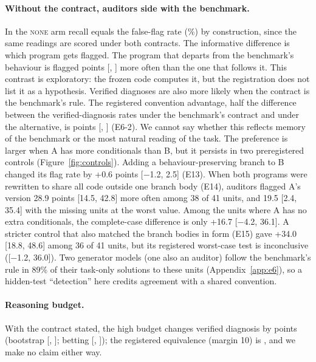 \paragraph{Without the contract, auditors side with the benchmark.} In the \textsc{none} arm recall equals the
false-flag rate (\NSixNoneFlag\%) by construction, since the same readings are scored under both contracts. The informative
difference is which program gets flagged. The program that departs from the benchmark's behaviour is
flagged \NSixFlagPref{} points [\NSixFlagPrefLo, \NSixFlagPrefHi] more often than the one that follows it. This contrast
is exploratory: the frozen code computes it, but the registration does not list it as a hypothesis. Verified diagnoses
are also more likely when the contract is the benchmark's rule. The registered convention advantage, half the
difference between the verified-diagnosis rates under the benchmark's contract and under the alternative, is
\NSixTwo{} points [\NSixTwoLo, \NSixTwoHi] (E6-2). We cannot say whether this reflects memory of the benchmark or the
most natural reading of the task. The preference is larger when A has more conditionals than B, but it persists in two preregistered controls
(Figure~\ref{fig:controls}). Adding a behaviour-preserving branch to B changed its flag rate by +0.6 points
[$-$1.2, 2.5] (E13). When both programs were rewritten to share all code outside one branch body (E14), auditors
flagged A's version 28.9 points [14.5, 42.8] more often among 38 of 41 units, and 19.5 [2.4, 35.4] with the
missing units at the worst value. Among the units where A has no extra conditionals, the complete-case difference
is only +16.7 [$-$4.2, 36.1]. A
stricter control that also matched the branch bodies in form (E15) gave +34.0 [18.8, 48.6] among 36 of 41 units, but
its registered worst-case test is inconclusive ([$-$1.2, 36.0]). Two generator models (one also an auditor) follow
the benchmark's rule in 89\% of their task-only solutions to these units (Appendix~\ref{app:e6}), so a hidden-test
``detection'' here credits agreement with a shared convention.

\paragraph{Reasoning budget.} With the contract stated, the high budget changes verified diagnosis by \NSixThree{}
points (bootstrap [\NSixThreeLo, \NSixThreeHi]; betting [\NSixThreeBetLo, \NSixThreeBetHi]); the registered equivalence
(margin 10) is \NSixThreeVerdict, and we make no claim either way.


